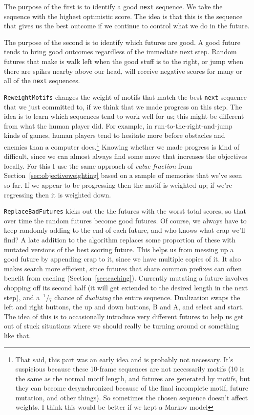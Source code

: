 \documentclass[twocolumn]{article}
\newcommand\sfrac[2]{{}\,$^{#1}$\!/{}\!$_{#2}$}
\begin{document}
The purpose of the first is to identify a good {\tt next} sequence. We
take the sequence with the highest optimistic score. The idea is that
this is the sequence that gives us the best outcome if we continue
to control what we do in the future.

The purpose of the second is to identify which futures are good. A
good future tends to bring good outcomes regardless of the immediate
next step. Random futures that make is walk left when the good stuff
is to the right, or jump when there are spikes nearby above our head,
will receive negative scores for many or all of the {\tt next}
sequences.

{\tt ReweightMotifs} changes the weight of motifs that match the best
{\tt next} sequence that we just committed to, if we think that we
made progress on this step. The idea is to learn which sequences tend
to work well for us; this might be different from what the human
player did. For example, in run-to-the-right-and-jump kinds of games,
human players tend to hesitate more before obstacles and enemies than
a computer does.\footnote{That said, this part was an early idea and
  is probably not necessary. It's suspicious because these 10-frame
  sequences are not necessarily motifs (10 is the same as the normal
  motif length, and futures are generated by motifs, but they can
  become desynchronized because of the final incomplete motif, future
  mutation, and other things). So sometimes the chosen sequence
  doesn't affect weights. I think this would be better if we kept a
  Markov model } Knowing whether we made progress is kind of
difficult, since we can almost always find some move that increases
the objectives locally. For this I use the same approach of {\em value
  fraction} from Section~\ref{sec:objectiveweighting} based on a
sample of memories that we've seen so far. If we appear to be
progressing then the motif is weighted up; if we're regressing then it
is weighted down.

{\tt ReplaceBadFutures} kicks out the the futures with the worst total
scores, so that over time the random futures become good futures. Of
course, we always have to keep randomly adding to the end of each
future, and who knows what crap we'll find? A late addition to the
algorithm replaces some proportion of these with mutated versions of
the best scoring future. This helps us from messing up a good future
by appending crap to it, since we have multiple copies of it. It also
makes search more efficient, since futures that share common prefixes
can often benefit from caching (Section~\ref{sec:caching}). Currently
mutating a future involves chopping off its second half (it will get
extended to the desired length in the next step), and a \sfrac{1}{7}
chance of {\em dualizing} the entire sequence. Dualization swaps
the left and right buttons, the up and down buttons, B and A, and 
select and start. The idea of this is to occasionally introduce
very different futures to help us get out of stuck situations where
we should really be turning around or something like that.
\end{document}
